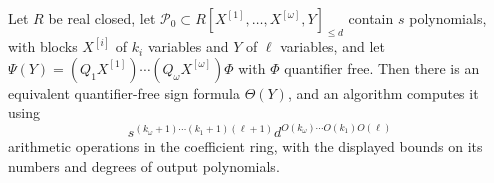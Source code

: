 Let \(R\) be real closed, let \(\mathcal P_0\subset R[X^{[1]},\ldots,X^{[\omega]},Y]_{\le d}\) contain \(s\) polynomials, with blocks \(X^{[i]}\) of \(k_i\) variables and \(Y\) of \(\ell\) variables, and let \(\Psi(Y)=(Q_1X^{[1]})\cdots(Q_\omega X^{[\omega]})\Phi\) with \(\Phi\) quantifier free.  Then there is an equivalent quantifier-free sign formula \(\Theta(Y)\), and an algorithm computes it using
\[
s^{(k_\omega+1)\cdots(k_1+1)(\ell+1)}
d^{O(k_\omega)\cdots O(k_1)O(\ell)}
\]
arithmetic operations in the coefficient ring, with the displayed bounds on its numbers and degrees of output polynomials.